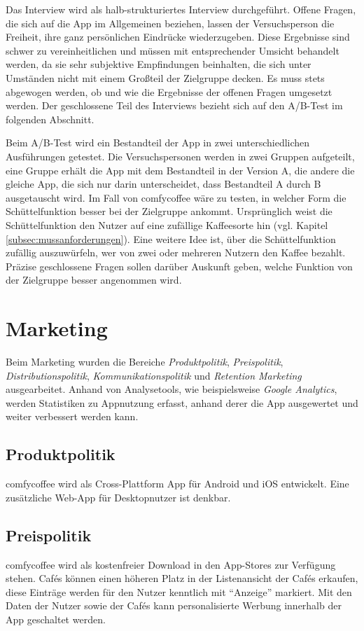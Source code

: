 Das Interview wird als halb-strukturiertes Interview durchgeführt. Offene Fragen, die sich auf die App im Allgemeinen beziehen, lassen der Versuchsperson die Freiheit, ihre ganz persönlichen Eindrücke wiederzugeben. Diese Ergebnisse sind schwer zu vereinheitlichen und müssen mit entsprechender Umsicht behandelt werden, da sie sehr subjektive Empfindungen beinhalten, die sich unter Umständen nicht mit einem Großteil der Zielgruppe decken. Es muss stets abgewogen werden, ob und wie die Ergebnisse der offenen Fragen umgesetzt werden. Der geschlossene Teil des Interviews bezieht sich auf den A/B-Test im folgenden Abschnitt.

Beim A/B-Test wird ein Bestandteil der App in zwei unterschiedlichen Ausführungen getestet. Die Versuchspersonen werden in zwei Gruppen aufgeteilt, eine Gruppe erhält die App mit dem Bestandteil in der Version A, die andere die gleiche App, die sich nur darin unterscheidet, dass Bestandteil A durch B ausgetauscht wird. Im Fall von comfycoffee wäre zu testen, in welcher Form die Schüttelfunktion besser bei der Zielgruppe ankommt. Ursprünglich weist die Schüttelfunktion den Nutzer auf eine zufällige Kaffeesorte hin (vgl. Kapitel \ref{subsec:mussanforderungen}). Eine weitere Idee ist, über die Schüttelfunktion zufällig auszuwürfeln, wer von zwei oder mehreren Nutzern den Kaffee bezahlt. Präzise geschlossene Fragen sollen darüber Auskunft geben, welche Funktion von der Zielgruppe besser angenommen wird.

\section{Marketing}
\label{sec:marketing}
Beim Marketing wurden die Bereiche \emph{Produktpolitik}, \emph{Preispolitik}, \emph{Distributionspolitik}, \emph{Kommunikationspolitik} und \emph{Retention Marketing} ausgearbeitet. Anhand von Analysetools, wie beispielsweise \emph{Google Analytics}, werden Statistiken zu Appnutzung erfasst, anhand derer die App ausgewertet und weiter verbessert werden kann.

\subsection{Produktpolitik}
comfycoffee wird als Cross-Plattform App für Android und iOS entwickelt. Eine zusätzliche Web-App für Desktopnutzer ist denkbar.

\subsection{Preispolitik}
comfycoffee wird als kostenfreier Download in den App-Stores zur Verfügung stehen. Cafés können einen höheren Platz in der Listenansicht der Cafés erkaufen, diese Einträge werden für den Nutzer kenntlich mit ``Anzeige'' markiert. Mit den Daten der Nutzer sowie der Cafés kann personalisierte Werbung innerhalb der App geschaltet werden.

